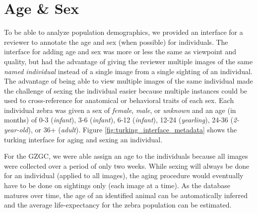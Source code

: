 \section{Age \& Sex}
To be able to analyze population demographics, we provided an interface for a reviewer to annotate the age and sex (when possible) for individuals.  The interface for adding age and sex was more or less the same as viewpoint and quality, but had the advantage of giving the reviewer multiple images of the same \textit{named individual} instead of a single image from a single sighting of an individual.  The advantage of being able to view multiple images of the same individual made the challenge of sexing the individual easier because multiple instances could be used to cross-reference for anatomical or behavioral traits of each sex.  Each individual zebra was given a sex of \textit{female}, \textit{male}, or \textit{unknown} and an age (in months) of 0-3 (\textit{infant}), 3-6 (\textit{infant}), 6-12 (\textit{infant}), 12-24 (\textit{yearling}), 24-36 (\textit{2-year-old}), or 36+ (\textit{adult}).  Figure 
\ref{fig:turking_interface_metadata} shows the turking interface for aging and sexing an individual.

For the GZGC, we were able assign an age to the individuals because all images were collected over a period of only two weeks.  While sexing will always be done for an individual (applied to all images), the aging procedure would eventually have to be done on sightings only (each image at a time).  As the database matures over time, the age of an identified animal can be automatically inferred and the average life-expectancy for the zebra population can be estimated.


